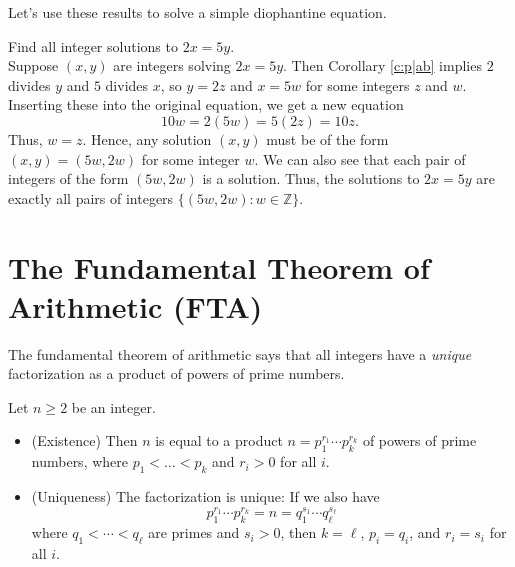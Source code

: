 \documentclass[11pt,dvipsnames]{book}
\numberwithin{figure}{section} %
\numberwithin{table}{section} %
\begin{document}
 Let's use these results to solve a simple diophantine equation.

 \begin{example}
 \label{ex:2x=5y}
 Find all integer solutions to $2x=5y$. \\

 Suppose $(x,y)$ are integers solving $2x=5y$. Then Corollary \ref{c:p|ab} implies $2$ divides $y$ and $5$ divides $x$, so $y=2z$ and $x=5w$ for some integers $z$ and $w$. Inserting these into the original equation, we get a new equation
 \[
 10w = 2(5w)=5(2z) = 10z.
 \]
 Thus, $w=z$. Hence, any solution $(x,y)$ must be of the form $(x,y)=(5w,2w)$ for some integer $w$. We can also see that each pair of integers of the form $(5w,2w)$ is a solution. Thus, the solutions to $2x=5y$ are exactly all pairs of integers $\{(5w,2w) :  w\in\mathbb{Z}\}$.

 \end{example}

\section{The Fundamental Theorem of Arithmetic (FTA)}

The fundamental theorem of arithmetic says that all integers have a \emph{unique} factorization as a product of powers of prime numbers.

\begin{theorem} \label{t:FTA} Let $n\geq 2$ be an integer.
\begin{itemize}
\item (Existence) Then $n$ is equal to a product $n=p_1^{r_{1}}\cdots p_k^{r_{k}}$ of powers of prime numbers, where $p_1< \ldots < p_k$ and $r_{i}>0$ for all $i$.
\item (Uniqueness) The factorization is unique: If we also have
$$ p_1^{r_{1}}\cdots p_k^{r_{k}} = n = q_1^{s_1}\cdots q_\ell^{s_{\ell}}$$
where  $q_{1}<\cdots < q_{\ell}$ are primes and $s_{i}> 0$, then $k=\ell$, $p_i=q_i$, and $r_{i}=s_{i}$ for all $i$.
\end{itemize}
\end{theorem}
\end{document}

